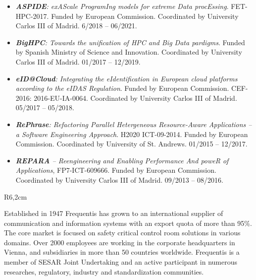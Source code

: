 \documentclass[a4paper,11pt]{article}
\begin{document}
\begin{itemize}

\item
\emph{\textbf{ASPIDE}: exAScale ProgramIng models for extreme Data procEssing}.
FET-HPC-2017.
Funded by European Commission.
Coordinated by University Carlos III of Madrid.
6/2018 -- 06/2021.

\item
\emph{\textbf{BigHPC}: Towards the unification of HPC and Big Data pardigms}.
Funded by Spanish Ministry of Science and Innovation.
Coordinated by University Carlos III of Madrid.
01/2017 -- 12/2019.

\item \emph{\textbf{eID@Cloud}: Integrating the eIdentification in European
cloud platforms according to the eIDAS Regulation}.
Funded by European Commission.
CEF-2016: 2016-EU-IA-0064.
Coordinated by University Carlos III of Madrid.
05/2017 -- 05/2018.

\item \emph{\textbf{RePhrase}: Refactoring Parallel Hetergeneous Resource-Aware Applications -- a Software Engineering Approach}.
H2020 ICT-09-2014.
Funded by European Commission.
Coordinated by University of St. Andrews.
01/2015 -- 12/2017.


\item \emph{\textbf{REPARA} -- Reengineering and Enabling Performance And poweR of Applications},
FP7-ICT-609666.
Funded by European Commission.
Coordinated by University Carlos III of Madrid.
09/2013 -- 08/2016.

\end{itemize}


\begin{wrapfigure}{R}{6,2cm}
\vspace{-3cm}
\hfill {}
\vspace{-1cm}
\end{wrapfigure}
\vspace{10pt}

Established in 1947 Frequentis has grown to an international supplier of communication and information systems with an export quota of more than 95\%. The core market is focused on safety critical control room solutions in various domains. Over 2000 employees are working in the corporate headquarters in Vienna, and subsidiaries in more than 50 countries worldwide. Frequentis is a member of SESAR Joint Undertaking and an active participant in numerous researches, regulatory, industry and standardization communities.
\end{document}
